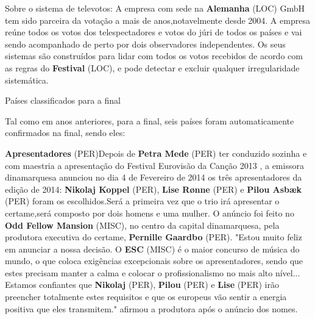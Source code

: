 \documentclass[12pt,a4paper]{article}
\begin{document}
Sobre o sistema de televotos: A empresa com sede na \textbf{Alemanha} (LOC) GmbH tem sido parceira da votação a mais de anos,notavelmente desde 2004. A empresa reúne todos os votos dos telespectadores e votos do júri de todos os países e vai sendo acompanhado de perto por dois observadores independentes. Os seus sistemas são construídos para lidar com todos os votos recebidos de acordo com as regras do \textbf{Festival} (LOC), e pode detectar e excluir qualquer irregularidade sistemática.



Países classificados para a final

Tal como em anos anteriores, para a final, seis países foram automaticamente confirmados na final, sendo eles:



\textbf{Apresentadores} (PER)Depois de \textbf{Petra Mede} (PER) ter conduzido sozinha e com maestria a apresentação do Festival Eurovisão da Canção 2013 , a emissora dinamarquesa anunciou no dia 4 de Fevereiro de 2014 os três apresentadores da edição de 2014: \textbf{Nikolaj Koppel} (PER), \textbf{Lise Rønne} (PER) e \textbf{Pilou Asbæk} (PER) foram os escolhidos.Será a primeira vez que o trio irá apresentar o certame,será composto por dois homens e uma mulher. O anúncio foi feito no \textbf{Odd Fellow Mansion} (MISC), no centro da capital dinamarquesa, pela produtora executiva do certame, \textbf{Pernille Gaardbo} (PER). "Estou muito feliz em anunciar a nossa decisão. O \textbf{ESC} (MISC) é o maior concurso de música do mundo, o que coloca exigências excepcionais sobre os apresentadores, sendo que estes precisam manter a calma e colocar o profissionalismo no mais alto nível... Estamos confiantes que \textbf{Nikolaj} (PER), \textbf{Pilou} (PER) e \textbf{Lise} (PER) irão preencher totalmente estes requisitos e que os europeus vão sentir a energia positiva que eles transmitem." afirmou a produtora após o anúncio dos nomes.
\end{document}
